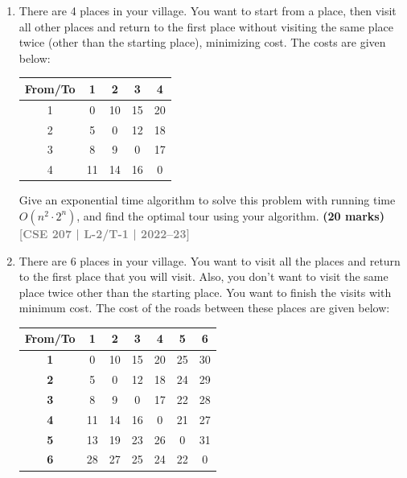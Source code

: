 \documentclass[12pt,a3paper]{article}
\newcommand{\yr}[1]{\hfill\textcolor{gray}{\small\textbf{[#1]}}}
\newcommand{\mk}[1]{\textcolor{orange!70!black}{\small\textbf{(#1 marks)}}}
\begin{document}
\begin{enumerate}
\item There are 4 places in your village. You want to start from a place, then visit all other places and return to the first place without visiting the same place twice (other than the starting place), minimizing cost. The costs are given below:
\begin{center}
\begin{tabular}{|c|c|c|c|c|}
\hline
\textbf{From/To} & \textbf{1} & \textbf{2} & \textbf{3} & \textbf{4} \\
\hline
1 & 0  & 10 & 15 & 20 \\
2 & 5  & 0  & 12 & 18 \\
3 & 8  & 9  & 0  & 17 \\
4 & 11 & 14 & 16 & 0  \\
\hline
\end{tabular}
\end{center}
Give an exponential time algorithm to solve this problem with running time $O(n^2 \cdot 2^n)$, and find the optimal tour using your algorithm.
\mk{20} \yr{CSE 207 | L-2/T-1 | 2022--23}

\item There are 6 places in your village. You want to visit all the places and return to 
    the first place that you will visit. Also, you don't want to visit the same place twice 
    other than the starting place. You want to finish the visits with minimum cost. The 
    cost of the roads between these places are given below:
    
    \begin{center}
    \begin{tabular}{|c|c|c|c|c|c|c|}
    \hline
    \textbf{From/To} & \textbf{1} & \textbf{2} & \textbf{3} & \textbf{4} & \textbf{5} & \textbf{6} \\ \hline
    \textbf{1}       & 0          & 10         & 15         & 20         & 25         & 30         \\ \hline
    \textbf{2}       & 5          & 0          & 12         & 18         & 24         & 29         \\ \hline
    \textbf{3}       & 8          & 9          & 0          & 17         & 22         & 28         \\ \hline
    \textbf{4}       & 11         & 14         & 16         & 0          & 21         & 27         \\ \hline
    \textbf{5}       & 13         & 19         & 23         & 26         & 0          & 31         \\ \hline
    \textbf{6}       & 28         & 27         & 25         & 24         & 22         & 0          \\ \hline
    \end{tabular}
    \end{center}


\end{enumerate}
\end{document}
